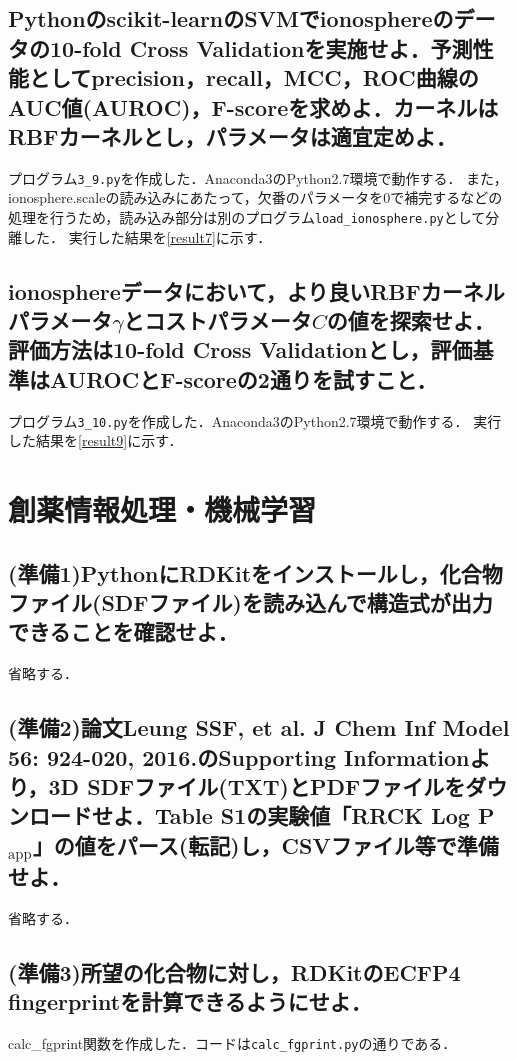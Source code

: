 \documentclass[uplatex,a4j]{jsarticle}
\begin{document}
  \subsection{Pythonのscikit-learnのSVMでionosphereのデータの10-fold Cross Validationを実施せよ．予測性能としてprecision，recall，MCC，ROC曲線のAUC値(AUROC)，F-scoreを求めよ．カーネルはRBFカーネルとし，パラメータは適宜定めよ．}
  プログラム{\tt 3\_9.py}を作成した．Anaconda3のPython2.7環境で動作する．
  また，ionosphere.scaleの読み込みにあたって，欠番のパラメータを0で補完するなどの処理を行うため，読み込み部分は別のプログラム{\tt load\_ionosphere.py}として分離した．
  実行した結果を\ref{result7}に示す．
  
  
  \subsection{ionosphereデータにおいて，より良いRBFカーネルパラメータ$\gamma$とコストパラメータ$C$の値を探索せよ．評価方法は10-fold Cross Validationとし，評価基準はAUROCとF-scoreの2通りを試すこと．}
  プログラム{\tt 3\_10.py}を作成した．Anaconda3のPython2.7環境で動作する．
  実行した結果を\ref{result9}に示す．
  
  
  \section{創薬情報処理・機械学習}
  \subsection{(準備1)PythonにRDKitをインストールし，化合物ファイル(SDFファイル)を読み込んで構造式が出力できることを確認せよ．}
  省略する．
  
  \subsection{(準備2)論文Leung SSF, et al. J Chem Inf Model 56: 924-020, 2016.のSupporting Informationより，3D SDFファイル(TXT)とPDFファイルをダウンロードせよ．Table S1の実験値「RRCK Log P$_\text{app}$」の値をパース(転記)し，CSVファイル等で準備せよ．}
  省略する．
  
  \subsection{(準備3)所望の化合物に対し，RDKitのECFP4 fingerprintを計算できるようにせよ．}
  calc\_fgprint関数を作成した．コードは{\tt calc\_fgprint.py}の通りである．
  
\end{document}
